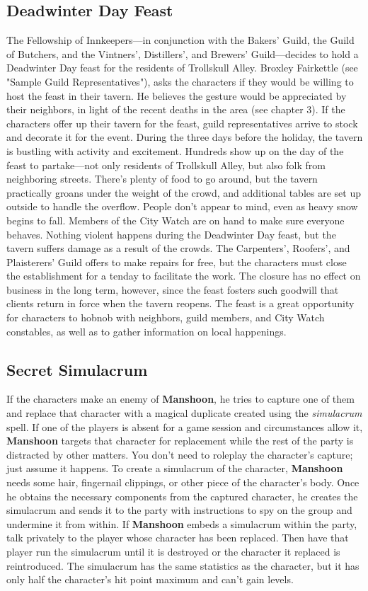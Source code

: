 \documentclass[10pt,a4paper,twoside,twocolumn,openany,nodeprecatedcode]{dndbook}
\begin{document}
\subsection{Deadwinter Day Feast}
The Fellowship of Innkeepers—in conjunction with the Bakers' Guild, the Guild of Butchers, and the Vintners', Distillers', and Brewers' Guild—decides to hold a Deadwinter Day feast for the residents of Trollskull Alley. Broxley Fairkettle (see "Sample Guild Representatives"), asks the characters if they would be willing to host the feast in their tavern. He believes the gesture would be appreciated by their neighbors, in light of the recent deaths in the area (see chapter 3).
If the characters offer up their tavern for the feast, guild representatives arrive to stock and decorate it for the event. During the three days before the holiday, the tavern is bustling with activity and excitement. Hundreds show up on the day of the feast to partake—not only residents of Trollskull Alley, but also folk from neighboring streets. There's plenty of food to go around, but the tavern practically groans under the weight of the crowd, and additional tables are set up outside to handle the overflow. People don't appear to mind, even as heavy snow begins to fall. Members of the City Watch are on hand to make sure everyone behaves.
Nothing violent happens during the Deadwinter Day feast, but the tavern suffers damage as a result of the crowds. The Carpenters', Roofers', and Plaisterers' Guild offers to make repairs for free, but the characters must close the establishment for a tenday to facilitate the work. The closure has no effect on business in the long term, however, since the feast fosters such goodwill that clients return in force when the tavern reopens.
The feast is a great opportunity for characters to hobnob with neighbors, guild members, and City Watch constables, as well as to gather information on local happenings.
\subsection{Secret Simulacrum}
If the characters make an enemy of \textbf{Manshoon}, he tries to capture one of them and replace that character with a magical duplicate created using the \textit{simulacrum} spell. If one of the players is absent for a game session and circumstances allow it, \textbf{Manshoon} targets that character for replacement while the rest of the party is distracted by other matters. You don't need to roleplay the character's capture; just assume it happens. To create a simulacrum of the character, \textbf{Manshoon} needs some hair, fingernail clippings, or other piece of the character's body. Once he obtains the necessary components from the captured character, he creates the simulacrum and sends it to the party with instructions to spy on the group and undermine it from within.
If \textbf{Manshoon} embeds a simulacrum within the party, talk privately to the player whose character has been replaced. Then have that player run the simulacrum until it is destroyed or the character it replaced is reintroduced. The simulacrum has the same statistics as the character, but it has only half the character's hit point maximum and can't gain levels.
\end{document}
